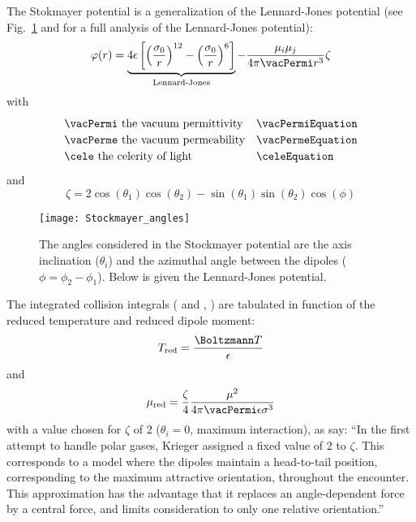 The Stokmayer potential is a generalization of the Lennard-Jones potential
(see Fig.~\ref{viscosity:Stockmayer_potential} and \citet{Jasper2014} for a
full analysis of the Lennard-Jones potential):
\begin{equation}
\varphi(r) = \underbrace{4 \LJdepth \left[\left(\frac{\LJdia[0]}{r}\right)^{12} - \left(\frac{\LJdia[0]}{r}\right)^{6}\right]}_\text{Lennard-Jones}
             - \frac{\dipole[i]\dipole[j]}{4\pi \vacPermi r^3}\zeta
\label{Stockmayer:equation}
\end{equation}
%
with 
%
\begin{equation}
\renewcommand{\arraystretch}{1.2}
\begin{array}{ll}
\vacPermi\text{ the vacuum permittivity} & \vacPermiEquation \\
\vacPerme\text{ the vacuum permeability} & \vacPermeEquation \\
\cele\text{ the celerity of light}       & \celeEquation
\end{array}
\end{equation}
%
and
%
\begin{equation}
\zeta = 2 \cos(\theta_1)\cos(\theta_2) - \sin(\theta_1)\sin(\theta_2)\cos(\phi)
\end{equation}
\begin{figure}
\centering
\texttt{[image: Stockmayer\_angles]}
\caption[Stockmayer/Lennard-Jones potential]{\label{viscosity:Stockmayer_potential}The angles considered in the
Stockmayer potential are the axis inclination ($\theta_i$) and the azimuthal
angle between the dipoles ($\phi = \phi_2 - \phi_1$). Below is given the
Lennard-Jones potential.}
\end{figure}

The integrated collision integrals ( and , \nounit) are tabulated
in function of the reduced temperature and reduced dipole moment:
\begin{equation}
\Temp_\text{red} = \frac{\Boltzmann\Temp}{\LJdepth}
\end{equation}
and
\begin{equation}
\dipole_\text{red} = \frac{\zeta}{4}\frac{\dipole^2}{4\pi\vacPermi\LJdepth\LJdia^3}
\end{equation}
with a value chosen for $\zeta$ of 2 ($\theta_i = 0$, maximum
interaction), as \citet{Monchick1961} say: 
\textsf{``In the first attempt to handle polar gases, Krieger
assigned a fixed value of 2 to $\zeta$. This corresponds to a
model where the dipoles maintain a head-to-tail position, 
corresponding to the maximum attractive orientation, throughout the encounter. This approximation
has the advantage that it replaces an angle-dependent
force by a central force, and limits consideration to
only one relative orientation.''}

